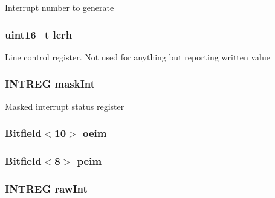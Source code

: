 \label{classPl011_a9bd4d49b818d8cf1a6dee0576d2ff039}
Interrupt number to generate \hypertarget{classPl011_a56614119b1851bb3386d42f108644601}{
\subsubsection[{lcrh}]{\setlength{\rightskip}{0pt plus 5cm}uint16\_\-t {\bf lcrh}}}
\label{classPl011_a56614119b1851bb3386d42f108644601}
Line control register. Not used for anything but reporting written value \hypertarget{classPl011_adca828df6ee9e8b800f1b5b229476304}{
\subsubsection[{maskInt}]{\setlength{\rightskip}{0pt plus 5cm}INTREG {\bf maskInt}}}
\label{classPl011_adca828df6ee9e8b800f1b5b229476304}
Masked interrupt status register \hypertarget{classPl011_aea5955c20392fa25a1c7a1359bcfc123}{
\subsubsection[{oeim}]{\setlength{\rightskip}{0pt plus 5cm}Bitfield$<$10$>$ {\bf oeim}}}
\label{classPl011_aea5955c20392fa25a1c7a1359bcfc123}
\hypertarget{classPl011_ab3404a9d5be230ce73a00d31bdf777a0}{
\subsubsection[{peim}]{\setlength{\rightskip}{0pt plus 5cm}Bitfield$<$8$>$ {\bf peim}}}
\label{classPl011_ab3404a9d5be230ce73a00d31bdf777a0}
\hypertarget{classPl011_ae2da020b580eb106d7e66a6b058a9e6d}{
\subsubsection[{rawInt}]{\setlength{\rightskip}{0pt plus 5cm}INTREG {\bf rawInt}}}
